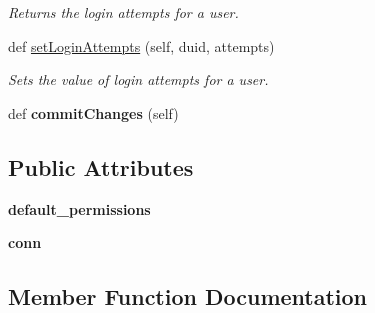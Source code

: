 \begin{DoxyCompactItemize}
\begin{DoxyCompactList}\small\item\em Returns the login attempts for a user. \end{DoxyCompactList}\item 
def \hyperlink{classhandler_1_1dao_1_1user__dao_1_1_user_d_a_o_aec0187ac1e8c477a072a45b040edde2a}{set\+Login\+Attempts} (self, duid, attempts)
\begin{DoxyCompactList}\small\item\em Sets the value of login attempts for a user. \end{DoxyCompactList}\item 
\mbox{\label{classhandler_1_1dao_1_1user__dao_1_1_user_d_a_o_a94c1e4101538b9c8a0e749eec63b8487}} 
def {\bfseries commit\+Changes} (self)
\end{DoxyCompactItemize}
\subsection*{Public Attributes}
\begin{DoxyCompactItemize}
\item 
\mbox{\label{classhandler_1_1dao_1_1user__dao_1_1_user_d_a_o_a62469aa1b879a3ea27dbb44506f98e2f}} 
{\bfseries default\+\_\+permissions}
\item 
\mbox{\label{classhandler_1_1dao_1_1user__dao_1_1_user_d_a_o_a428d3eaa0c903989ee9503f47ec26bc5}} 
{\bfseries conn}
\end{DoxyCompactItemize}


\subsection{Member Function Documentation}
\mbox{\label{classhandler_1_1dao_1_1user__dao_1_1_user_d_a_o_aa2dafcbc31416860bc4b64c2332c0f5c}} 
